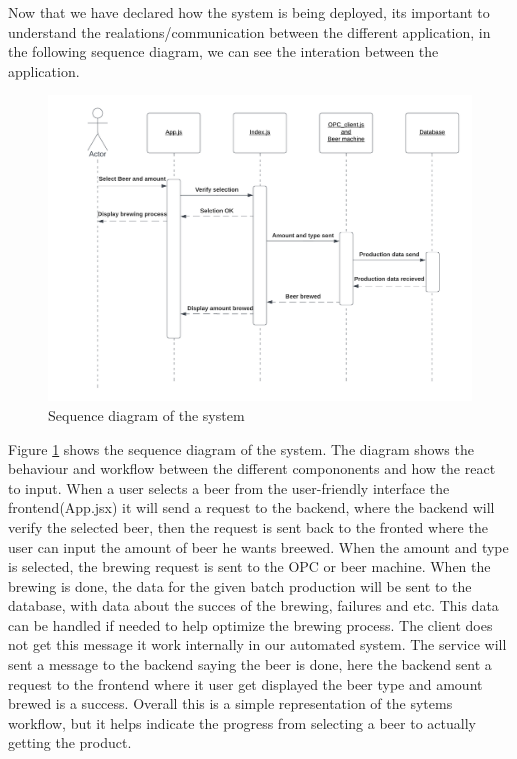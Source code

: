 
Now that we have declared how the system is being deployed, its important to understand the realations/communication between the different application, in the following sequence diagram, we can see the interation between the application.

\begin{center}
    \centering
    \begin{figure}[H]
        \includegraphics[width=1\textwidth]{img/SQdiagram_implementation.png}
        \caption{Sequence diagram of the system}
        \label{fig:SQdiagram_implementation}
    \end{figure}
\end{center}

Figure \ref{fig:SQdiagram_implementation} shows the sequence diagram of the system. The diagram shows the behaviour and workflow between the different compononents and how the react to input. When a user selects a beer from the user-friendly interface the frontend(App.jsx) it will send a request to the backend, where the backend will verify the selected beer, then the request is sent back to the fronted where the user can input the amount of beer he wants breewed. When the amount and type is selected, the brewing request is sent to the OPC or beer machine. 
When the brewing is done, the data for the given batch production will be sent to the database, with data about the succes of the brewing, failures and etc. This data can be handled if needed to help optimize the brewing process. The client does not get this message it work internally in our automated system. The service will sent a message to the backend saying the beer is done, here the backend sent a request to the frontend where it user get displayed the beer type and amount brewed is a success.
Overall this is a simple representation of the sytems workflow, but it helps indicate the progress from selecting a beer to actually getting the product.


